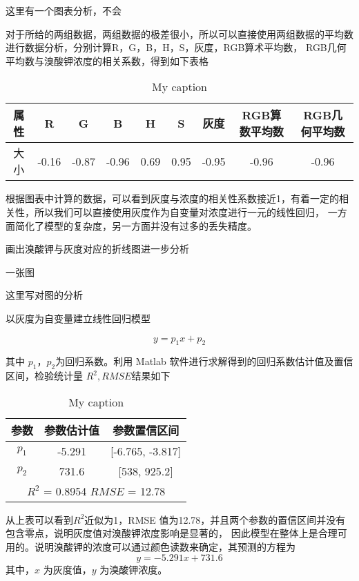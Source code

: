     这里有一个图表分析，不会

    对于所给的两组数据，两组数据的极差很小，所以可以直接使用两组数据的平均数进行数据分析，分别计算R，G，B，H，S，灰度，RGB算术平均数，
    RGB几何平均数与溴酸钾浓度的相关系数，得到如下表格

    \begin{table}[H]
        \centering
        \caption{My caption}
        \label{my-label}
        \begin{tabular}{@{}ccccccccc@{}}
        \toprule
        属性 & R     & G     & B     & H    & S    & 灰度    & RGB算数平均数 & RGB几何平均数 \\ \midrule
        大小 & -0.16 & -0.87 & -0.96 & 0.69 & 0.95 & -0.95 & -0.96    & -0.96    \\ \bottomrule
        \end{tabular}
        \end{table}


    根据图表中计算的数据，可以看到灰度与浓度的相关性系数接近1，有着一定的相关性，所以我们可以直接使用灰度作为自变量对浓度进行一元的线性回归，
    一方面简化了模型的复杂度，另一方面并没有过多的丢失精度。
    
    画出溴酸钾与灰度对应的折线图进一步分析

    一张图

    这里写对图的分析

    以灰度为自变量建立线性回归模型

    $$ y = p_1 x + p_2$$

    其中 $p_{1}，p_{2}$为回归系数。利用 Matlab 软件进行求解得到的回归系数估计值及置信区间，检验统计量 $R^2, RMSE $结果如下

    \begin{table}[H]
        \centering
        \caption{My caption}
        \label{my-label}
        \begin{tabular}{@{}ccc@{}}
        \toprule
        参数        & 参数估计值      & 参数置信区间                   \\ \midrule
        $p_1$     & -5.291     & {[}-6.765, -3.817{]}     \\
        $p_2$     & 731.6      & {[}538, 925.2{]}         \\
        \hline
        \multicolumn{3}{c}{$R^2$ = 0.8954 $RMSE$ = 12.78} \\ \bottomrule
        \end{tabular}
        \end{table}
    从上表可以看到$R^2$近似为1，RMSE 值为12.78，并且两个参数的置信区间并没有包含零点，说明灰度值对溴酸钾浓度影响是显著的，
    因此模型在整体上是合理可用的。说明溴酸钾的浓度可以通过颜色读数来确定，其预测的方程为
    $$ y = -5.291 x + 731.6 $$ 
    其中，$x$ 为灰度值，$y$ 为溴酸钾浓度。

